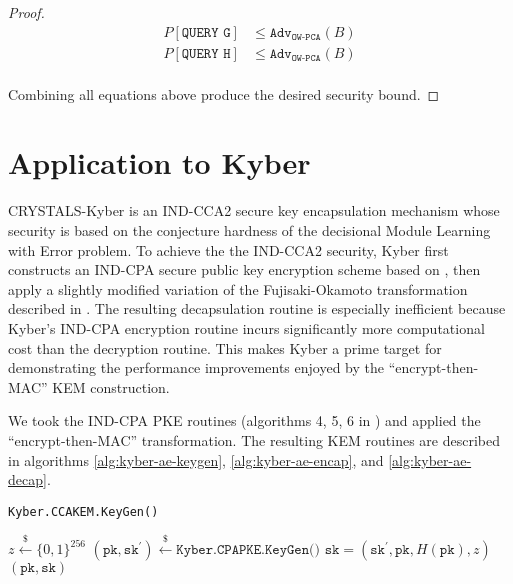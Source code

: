 \documentclass[floatrow,journal=tches,submission]{iacrtrans}
\newcommand{\pk}{\texttt{pk}}
\newcommand{\sk}{\texttt{sk}}
\newcommand{\leftsample}{\stackrel{\$}{\leftarrow}}
\newcommand{\adv}{\texttt{Adv}}
\begin{document}
\begin{proof}
    \begin{equation*}
        \begin{aligned}
            P\left[\texttt{QUERY G}\right] &\leq \adv_\texttt{OW-PCA}(B) \\
            P\left[\texttt{QUERY H}\right] &\leq \adv_\texttt{OW-PCA}(B) \\
        \end{aligned}
    \end{equation*}

    Combining all equations above produce the desired security bound.
\end{proof}

\section{Application to Kyber}\label{sec:experimental-results}
CRYSTALS-Kyber \cite{bos2018crystals}\cite{avanzi2019crystals} is an IND-CCA2 secure key encapsulation mechanism whose security is based on the conjecture hardness of the decisional Module Learning with Error problem. To achieve the the IND-CCA2 security, Kyber first constructs an IND-CPA secure public key encryption scheme based on \cite{lpr2013ideal}, then apply a slightly modified variation of the Fujisaki-Okamoto transformation described in \cite{hofheinz2017modular}. The resulting decapsulation routine is especially inefficient because Kyber's IND-CPA encryption routine incurs significantly more computational cost than the decryption routine. This makes Kyber a prime target for demonstrating the performance improvements enjoyed by the ``encrypt-then-MAC'' KEM construction.

We took the IND-CPA PKE routines (algorithms 4, 5, 6 in \cite{avanzi2019crystals}) and applied the ``encrypt-then-MAC'' transformation. The resulting KEM routines are described in algorithms \ref{alg:kyber-ae-keygen}, \ref{alg:kyber-ae-encap}, and \ref{alg:kyber-ae-decap}.

\begin{algorithm}[H]
    \caption{\texttt{Kyber.CCAKEM.KeyGen()}}\label{alg:kyber-ae-keygen}
    \begin{algorithmic}[1]
        \State $z \leftsample \{0,1\}^{256}$
        \State $(\pk, \sk^\prime) \leftsample \texttt{Kyber.CPAPKE.KeyGen()}$
        \State $\sk = (\sk^\prime, \pk, H(\pk), z)$
        \State \Return $(\pk, \sk)$
    \end{algorithmic}
\end{algorithm}
\end{document}
